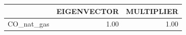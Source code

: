 \begin{tabular}{rrr}
  \hline
 & EIGENVECTOR & MULTIPLIER \\ 
  \hline
CO\_nat\_gas & 1.00 & 1.00 \\ 
   \hline
\end{tabular}
